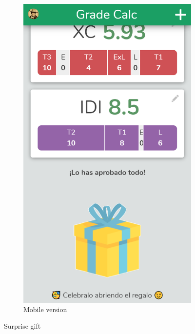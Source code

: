 \begin{figure}[ht!]
\begin{subfigure}[b]{0.243\textwidth-0.1cm}
        \includegraphics[width=\textwidth]{media/screenshots/screenshot-gift.png}
        \caption{Mobile version}
    \end{subfigure}
    \caption{Surprise gift}
    \label{fig:gift}
\end{figure}

\vfill

